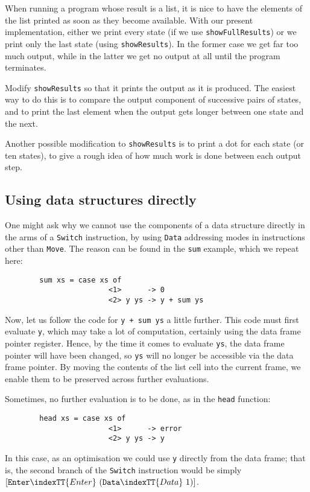 \begin{exercise}
When running a program whose result is a list, it is nice to have the
elements of the list printed as soon as they become available.  With
our present implementation, either we print every state (if we use
\mbox{\tt showFullResults}) or we print only the last state (using
\mbox{\tt showResults}).  In the former case we get far too much output, while
in the latter we get no output at all until the program terminates.

Modify \mbox{\tt showResults} so that it prints the output as it is produced.
The easiest way to do this is to compare the output component of
successive pairs of states, and to print the last element when the output
gets longer between one state and the next.

Another possible modification to \mbox{\tt showResults} is to print a dot for each state
(or ten states), to give a rough idea of how much work is done between each
output step.
\end{exercise}

\subsection{Using data structures directly\advanced}

One might ask why we cannot use the components of a data structure
directly in the arms of a \mbox{\tt Switch} instruction, by using
\mbox{\tt Data} addressing modes in instructions other than \mbox{\tt Move}.
The reason can be found in the \mbox{\tt sum} example, which we repeat here:
\begin{verbatim}
        sum xs = case xs of
                        <1>      -> 0
                        <2> y ys -> y + sum ys
\end{verbatim}
Now, let us follow the code for \mbox{\tt y\ +\ sum\ ys} a little further.
This code
must first evaluate \mbox{\tt y}, which may take a lot of computation, certainly
using the data frame pointer register.  Hence, by the time it comes to
evaluate \mbox{\tt ys}, the data frame pointer will have been changed, so \mbox{\tt ys} will
no longer be accessible via the data frame pointer.
By moving the contents of the list cell into the
current frame, we enable them to be preserved across further evaluations.

Sometimes, no further evaluation is to be done, as in the \mbox{\tt head} function:
\begin{verbatim}
        head xs = case xs of
                        <1>      -> error
                        <2> y ys -> y
\end{verbatim}
In this case, as an optimisation we could use \mbox{\tt y} directly from the
data frame; that is,
the second branch of the \mbox{\tt Switch} instruction would be simply
$[\mbox{\tt Enter}\indexTT{Enter}~(\mbox{\tt Data}\indexTT{Data}~1)]$.


